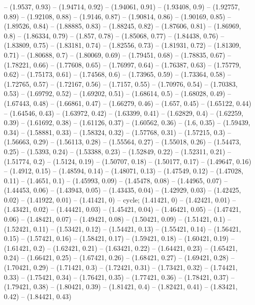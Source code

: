 -- (1.9537, 0.93)
-- (1.94714, 0.92)
-- (1.94061, 0.91)
-- (1.93408, 0.9)
-- (1.92757, 0.89)
-- (1.92108, 0.88)
-- (1.9146, 0.87)
-- (1.90814, 0.86)
-- (1.90169, 0.85)
-- (1.89526, 0.84)
-- (1.88885, 0.83)
-- (1.88245, 0.82)
-- (1.87606, 0.81)
-- (1.86969, 0.8)
-- (1.86334, 0.79)
-- (1.857, 0.78)
-- (1.85068, 0.77)
-- (1.84438, 0.76)
-- (1.83809, 0.75)
-- (1.83181, 0.74)
-- (1.82556, 0.73)
-- (1.81931, 0.72)
-- (1.81309, 0.71)
-- (1.80688, 0.7)
-- (1.80069, 0.69)
-- (1.79451, 0.68)
-- (1.78835, 0.67)
-- (1.78221, 0.66)
-- (1.77608, 0.65)
-- (1.76997, 0.64)
-- (1.76387, 0.63)
-- (1.75779, 0.62)
-- (1.75173, 0.61)
-- (1.74568, 0.6)
-- (1.73965, 0.59)
-- (1.73364, 0.58)
-- (1.72765, 0.57)
-- (1.72167, 0.56)
-- (1.7157, 0.55)
-- (1.70976, 0.54)
-- (1.70383, 0.53)
-- (1.69792, 0.52)
-- (1.69202, 0.51)
-- (1.68614, 0.5)
-- (1.68028, 0.49)
-- (1.67443, 0.48)
-- (1.66861, 0.47)
-- (1.66279, 0.46)
-- (1.657, 0.45)
-- (1.65122, 0.44)
-- (1.64546, 0.43)
-- (1.63972, 0.42)
-- (1.63399, 0.41)
-- (1.62829, 0.4)
-- (1.62259, 0.39)
-- (1.61692, 0.38)
-- (1.61126, 0.37)
-- (1.60562, 0.36)
-- (1.6, 0.35)
-- (1.59439, 0.34)
-- (1.58881, 0.33)
-- (1.58324, 0.32)
-- (1.57768, 0.31)
-- (1.57215, 0.3)
-- (1.56663, 0.29)
-- (1.56113, 0.28)
-- (1.55564, 0.27)
-- (1.55018, 0.26)
-- (1.54473, 0.25)
-- (1.5393, 0.24)
-- (1.53388, 0.23)
-- (1.52849, 0.22)
-- (1.52311, 0.21)
-- (1.51774, 0.2)
-- (1.5124, 0.19)
-- (1.50707, 0.18)
-- (1.50177, 0.17)
-- (1.49647, 0.16)
-- (1.4912, 0.15)
-- (1.48594, 0.14)
-- (1.48071, 0.13)
-- (1.47549, 0.12)
-- (1.47028, 0.11)
-- (1.4651, 0.1)
-- (1.45993, 0.09)
-- (1.45478, 0.08)
-- (1.44965, 0.07)
-- (1.44453, 0.06)
-- (1.43943, 0.05)
-- (1.43435, 0.04)
-- (1.42929, 0.03)
-- (1.42425, 0.02)
-- (1.41922, 0.01)
-- (1.41421, 0)
-- cycle;
\drawBand (1.41421, 0)
-- (1.42421, 0.01)
-- (1.43421, 0.02)
-- (1.44421, 0.03)
-- (1.45421, 0.04)
-- (1.46421, 0.05)
-- (1.47421, 0.06)
-- (1.48421, 0.07)
-- (1.49421, 0.08)
-- (1.50421, 0.09)
-- (1.51421, 0.1)
-- (1.52421, 0.11)
-- (1.53421, 0.12)
-- (1.54421, 0.13)
-- (1.55421, 0.14)
-- (1.56421, 0.15)
-- (1.57421, 0.16)
-- (1.58421, 0.17)
-- (1.59421, 0.18)
-- (1.60421, 0.19)
-- (1.61421, 0.2)
-- (1.62421, 0.21)
-- (1.63421, 0.22)
-- (1.64421, 0.23)
-- (1.65421, 0.24)
-- (1.66421, 0.25)
-- (1.67421, 0.26)
-- (1.68421, 0.27)
-- (1.69421, 0.28)
-- (1.70421, 0.29)
-- (1.71421, 0.3)
-- (1.72421, 0.31)
-- (1.73421, 0.32)
-- (1.74421, 0.33)
-- (1.75421, 0.34)
-- (1.76421, 0.35)
-- (1.77421, 0.36)
-- (1.78421, 0.37)
-- (1.79421, 0.38)
-- (1.80421, 0.39)
-- (1.81421, 0.4)
-- (1.82421, 0.41)
-- (1.83421, 0.42)
-- (1.84421, 0.43)
